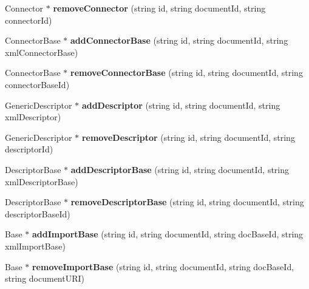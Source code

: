 \begin{CompactItemize}
\item 
Connector $\ast$ \textbf{removeConnector} (string id, string documentId, string connectorId)\label{classbr_1_1pucrio_1_1telemidia_1_1ginga_1_1ncl_1_1PrivateBaseManager_ee84697c462f9bdcbbf20b6bfd4a972a}

\item 
ConnectorBase $\ast$ \textbf{addConnectorBase} (string id, string documentId, string xmlConnectorBase)\label{classbr_1_1pucrio_1_1telemidia_1_1ginga_1_1ncl_1_1PrivateBaseManager_11683121715a5ae73540c93e12d8493c}

\item 
ConnectorBase $\ast$ \textbf{removeConnectorBase} (string id, string documentId, string connectorBaseId)\label{classbr_1_1pucrio_1_1telemidia_1_1ginga_1_1ncl_1_1PrivateBaseManager_f27a2e48b29f22b5c107b5232d5efab5}

\item 
GenericDescriptor $\ast$ \textbf{addDescriptor} (string id, string documentId, string xmlDescriptor)\label{classbr_1_1pucrio_1_1telemidia_1_1ginga_1_1ncl_1_1PrivateBaseManager_c54f6c7ba6a51fb41fd825613f75edae}

\item 
GenericDescriptor $\ast$ \textbf{removeDescriptor} (string id, string documentId, string descriptorId)\label{classbr_1_1pucrio_1_1telemidia_1_1ginga_1_1ncl_1_1PrivateBaseManager_c09f910a371e349f12bd5474b9e8a8cf}

\item 
DescriptorBase $\ast$ \textbf{addDescriptorBase} (string id, string documentId, string xmlDescriptorBase)\label{classbr_1_1pucrio_1_1telemidia_1_1ginga_1_1ncl_1_1PrivateBaseManager_5009758ee0518fa9c4d41eea3afbda77}

\item 
DescriptorBase $\ast$ \textbf{removeDescriptorBase} (string id, string documentId, string descriptorBaseId)\label{classbr_1_1pucrio_1_1telemidia_1_1ginga_1_1ncl_1_1PrivateBaseManager_b402b568e8deaeef7da55054673acd25}

\item 
Base $\ast$ \textbf{addImportBase} (string id, string documentId, string docBaseId, string xmlImportBase)\label{classbr_1_1pucrio_1_1telemidia_1_1ginga_1_1ncl_1_1PrivateBaseManager_52a7a9f463a6ce2c13510808a9514b81}

\item 
Base $\ast$ \textbf{removeImportBase} (string id, string documentId, string docBaseId, string documentURI)\label{classbr_1_1pucrio_1_1telemidia_1_1ginga_1_1ncl_1_1PrivateBaseManager_085a07acf472703af87c5eb930b914d3}


\end{CompactItemize}
